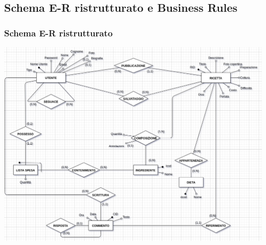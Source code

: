 \documentclass[12pt]{extarticle}
\begin{document}
\subsection{Schema E-R ristrutturato e Business Rules}

\subsubsection{Schema E-R ristrutturato}
\includegraphics[width=\textwidth]{er2.png}
\end{document}

